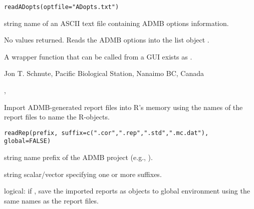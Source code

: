 \documentclass[letterpaper]{book}
\begin{document}
%
\begin{Usage}
\begin{verbatim}
readADopts(optfile="ADopts.txt")
\end{verbatim}
\end{Usage}
%
\begin{Arguments}
\begin{ldescription}
\item[\code{optfile}] string name of an ASCII text file containing ADMB 
options information.
\end{ldescription}
\end{Arguments}
%
\begin{Value}
No values returned. Reads the ADMB options into the list object .
\end{Value}
%
\begin{Note}\relax
A wrapper function that can be called from a GUI exists as .
\end{Note}
%
\begin{Author}\relax
 Jon T. Schnute, Pacific Biological Station, Nanaimo BC, Canada 
\end{Author}
%
\begin{SeeAlso}\relax
 , 
\end{SeeAlso}
%
\begin{Description}\relax
Import ADMB-generated report files into R's memory using the names of the 
report files to name the R-objects.
\end{Description}
%
\begin{Usage}
\begin{verbatim}
readRep(prefix, suffix=c(".cor",".rep",".std",".mc.dat"), global=FALSE)
\end{verbatim}
\end{Usage}
%
\begin{Arguments}
\begin{ldescription}
\item[\code{prefix}] string name prefix of the ADMB project (e.g., ).
\item[\code{suffix}] string scalar/vector specifying one or more suffixes.
\item[\code{global}] logical: if , save the imported reports as objects to 
global environment using the same names as the report files.
\end{ldescription}
\end{Arguments}
\end{document}
